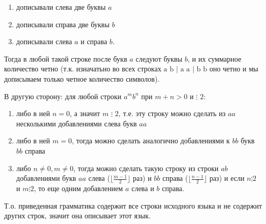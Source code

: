 \documentclass[12pt,a4paper]{scrartcl}
\begin{document}
\begin{description}
	\begin{enumerate}
		\item дописывали слева две буквы $a$
		
		\item дописывали справа две буквы $b$
	
		\item дописывали слева $a$ и справа $b$.
	\end{enumerate}
	
	Тогда в любой такой строке после букв $a$ следуют буквы $b$, и их суммарное количество четно (т.к. изначатьно во всех строках $\text{a b | a a | b b}$ оно четно и мы дописываем только четное количество символов).
	
	В другую сторону: для любой строки $a^mb^n$ при $m+n > 0$ и $\vdots \,\, 2$:
	
	\begin{enumerate}
		\item либо в ней $n=0$, а значит $m \,\,\vdots\,\,2$, т.е. эту строку можно сделать из $aa$ несколькими добавлениями слева букв $aa$
		\item либо в ней $m=0$, тогда можно сделать аналогично добавлениями к $bb$ букв $bb$ справа
		\item либо $n \neq 0, m \neq 0$, тогда можно сделать такую строку из строки $ab$ добавлениями букв $aa$ слева ($\lfloor\frac{m-1}{2}\rfloor$ раз) и $bb$ справа ($\lfloor\frac{n-1}{2}\rfloor$ раз) и если $n \vdots 2$ и $m \vdots 2$, то еще одним добавлением $a$ слева и $b$ справа.
	\end{enumerate}

	Т.о. приведенная грамматика содержит все строки исходного языка и не содержит других строк, значит она описывает этот язык.
	
	
\end{description}
\end{document}
